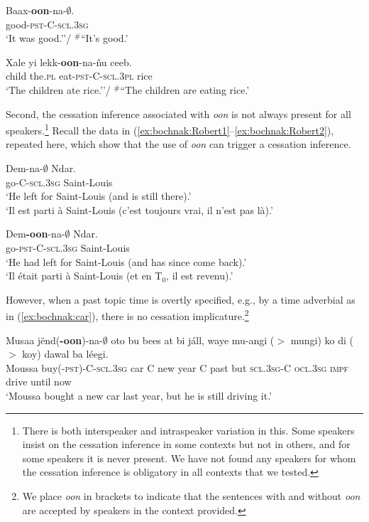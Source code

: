 \documentclass[output=paper,newtxmath,modfonts,nonflat,draftmode]{langsci/langscibook}
\begin{document}
\ea
\gll Baax-\textbf{oon}-na-$\emptyset$.\\
good-\textsc{pst}-C-\textsc{scl.3sg}\\
\glt `It was good.''/ $^{\#}$``It's good.'\label{ex:bochnak:good2}
\z

\ea
\gll Xale yi lekk-\textbf{oon}-na-\~nu ceeb.\\
child the.\textsc{pl} eat-\textsc{pst}-C-\textsc{scl.3pl} rice\\
\glt `The children ate rice.''/ $^{\#}$``The children are eating
  rice.'\label{ex:bochnak:eat3}
\z

Second, the cessation inference associated with \textit{oon} is not
always present for all speakers.\footnote{There is both interspeaker
  and intraspeaker variation in this. Some speakers insist on the
  cessation inference in some contexts but not in others, and for some
  speakers it is never present. We have not found any speakers for
  whom the cessation inference is obligatory in all contexts that we tested.} Recall the data in (\ref{ex:bochnak:Robert1}--\ref{ex:bochnak:Robert2}), repeated here, which show that the use of \textit{oon} can
trigger a cessation inference.

\ea
\gll\label{leave1-rep}Dem-na-$\emptyset$ Ndar.\\
go-C-\textsc{scl.3sg} Saint-Louis\\
\glt `He left for Saint-Louis (and is still there).'\\`Il est parti \`a Saint-Louis (c'est toujours vrai, il n'est
  pas l\`a).' \hfill \citep[279]{robert91approche}
\z

\ea
\gll\label{leave2-rep}Dem\textbf{-oon}-na-$\emptyset$ Ndar.\\
go-\textsc{pst-C-scl.3sg} Saint-Louis\\
\glt `He had left for Saint-Louis (and has since come back).'\\`Il \'etait parti \`a Saint-Louis (et en T$_0$,
  il est revenu).' \hfill \citep[279]{robert91approche}
\z

However, when a past topic time is overtly specified, e.g., by a time adverbial as in (\ref{ex:bochnak:car}), there is no cessation implicature.\footnote{We place \textit{oon} in brackets to indicate that the sentences with and without \textit{oon} are accepted by speakers in the context provided.}

\ea\label{ex:bochnak:car}
\gll Musaa j\"end(\textbf{-oon})-na-$\emptyset$ oto bu bees at bi j\'all, waye mu-{angi ($>$ mungi)} ko {di ($>$ koy)} dawal ba l\'eegi.\\
Moussa buy(-\textsc{pst})-C-\textsc{scl.3sg} car C new year C past but \textsc{scl.3sg}-C \textsc{ocl.3sg} \textsc{impf} drive until now\\
\glt `Moussa bought a new car last year, but he is still driving it.' 
\z
\end{document}
